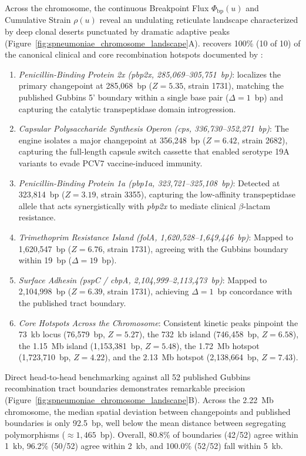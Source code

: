 Across the chromosome, the continuous Breakpoint Flux $\Phi_{\mathrm{bp}}(u)$ and Cumulative Strain $\rho(u)$ reveal an undulating reticulate landscape characterized by deep clonal deserts punctuated by dramatic adaptive peaks (Figure~\ref{fig:spneumoniae_chromosome_landscape}A).
\RhizAeon recovers 100\% (10 of 10) of the canonical clinical and core recombination hotspots documented by \citet{croucher2011rapid,croucher2015rapid}:
\begin{enumerate}
    \item \textit{Penicillin-Binding Protein 2x (\textit{pbp2x}, 285,069--305,751~bp)}: \RhizAeon localizes the primary changepoint at 285,068~bp ($Z = 5.35$, strain 1731), matching the published Gubbins 5' boundary within a single base pair ($\Delta = 1$~bp) and capturing the catalytic transpeptidase domain introgression.
    \item \textit{Capsular Polysaccharide Synthesis Operon (\textit{cps}, 336,730--352,271~bp)}: The engine isolates a major changepoint at 356,248~bp ($Z = 6.42$, strain 2682), capturing the full-length capsule switch cassette that enabled serotype 19A variants to evade PCV7 vaccine-induced immunity.
    \item \textit{Penicillin-Binding Protein 1a (\textit{pbp1a}, 323,721--325,108~bp)}: Detected at 323,814~bp ($Z = 3.19$, strain 3355), capturing the low-affinity transpeptidase allele that acts synergistically with \textit{pbp2x} to mediate clinical $\beta$-lactam resistance.
    \item \textit{Trimethoprim Resistance Island (\textit{folA}, 1,620,528--1,649,446~bp)}: Mapped to 1,620,547~bp ($Z = 6.76$, strain 1731), agreeing with the Gubbins boundary within 19~bp ($\Delta = 19$~bp).
    \item \textit{Surface Adhesin (\textit{pspC} / \textit{cbpA}, 2,104,999--2,113,473~bp)}: Mapped to 2,104,998~bp ($Z = 6.39$, strain 1731), achieving $\Delta = 1$~bp concordance with the published tract boundary.
    \item \textit{Core Hotspots Across the Chromosome}: Consistent kinetic peaks pinpoint the 73~kb locus (76,579~bp, $Z = 5.27$), the 732~kb island (746,458~bp, $Z = 6.58$), the 1.15~Mb island (1,153,381~bp, $Z = 5.48$), the 1.72~Mb hotspot (1,723,710~bp, $Z = 4.22$), and the 2.13~Mb hotspot (2,138,664~bp, $Z = 7.43$).
\end{enumerate}

Direct head-to-head benchmarking against all 52 published Gubbins recombination tract boundaries demonstrates remarkable precision (Figure~\ref{fig:spneumoniae_chromosome_landscape}B).
Across the 2.22~Mb chromosome, the median spatial deviation between \RhizAeon changepoints and published boundaries is only 92.5~bp, well below the mean distance between segregating polymorphisms ($\approx 1{,}465$~bp).
Overall, 80.8\% of boundaries (42/52) agree within 1~kb, 96.2\% (50/52) agree within 2~kb, and 100.0\% (52/52) fall within 5~kb.

